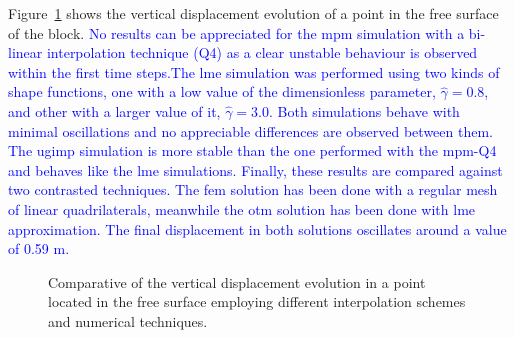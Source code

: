 \documentclass[preprint,12pt,a4paper]{elsarticle}
\begin{document}
Figure~\ref{fig:vertical-displacement-block} shows the vertical
displacement evolution of a point in the free surface of the
block. \textcolor{blue}{No results can be appreciated for the \acrshort{mpm} simulation with a bi-linear interpolation technique (Q4) as a clear unstable behaviour is observed within the first time steps.The \acrshort{lme} simulation was performed using two kinds of shape functions, one with a low value of the dimensionless parameter, $\widehat{\gamma} = 0.8$, and other with a larger value of it, $\widehat{\gamma} = 3.0$. Both simulations behave with minimal oscillations and no appreciable differences are observed between them. The \acrshort{ugimp} simulation is more stable than the one performed with the \acrshort{mpm}-Q4 and behaves like the \acrshort{lme} simulations. Finally, these results are compared against two contrasted techniques. The \acrshort{fem} solution has been done with a regular mesh of linear quadrilaterals, meanwhile the \acrshort{otm} solution has been done with \acrshort{lme} approximation. The final displacement in both solutions oscillates around a value of 0.59 m.} 
\begin{figure}
  \centering
  \caption{Comparative of the vertical displacement evolution in a
    point located in the free surface employing different
    interpolation schemes and numerical techniques.} 
  \label{fig:vertical-displacement-block}
\end{figure}
\end{document}

